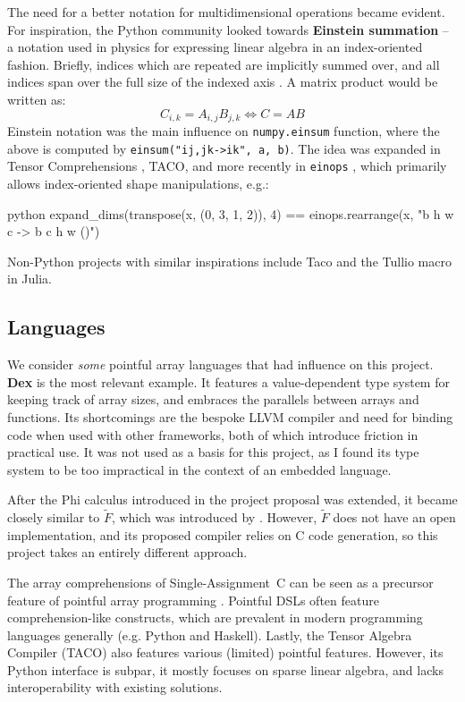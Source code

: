 The need for a better notation for multidimensional operations became evident. For inspiration, the Python community looked towards \textbf{Einstein summation} -- a notation used in physics for expressing linear algebra in an index-oriented fashion. Briefly, indices which are repeated are implicitly summed over, and all indices span over the full size of the indexed axis \cite{aahlander2002einstein}. A matrix product would be written as:
$$ C_{i,k} = A_{i,j} B_{j,k} \iff C = AB $$
Einstein notation was the main influence on \texttt{numpy.einsum} function, where the above is computed by \texttt{einsum("ij,jk->ik", a, b)}. The idea was expanded in Tensor Comprehensions \cite{vasilache2018tensor}, TACO, and more recently in \texttt{einops} \cite{rogozhnikov2021einops}, which primarily allows index-oriented shape manipulations, e.g.:
\begin{center}
\begin{cminted}{python}
expand_dims(transpose(x, (0, 3, 1, 2)), 4) == einops.rearrange(x, "b h w c -> b c h w ()")
\end{cminted}
\end{center}
Non-Python projects with similar inspirations include Taco \cite{kjolstad2017tensor} and the Tullio macro in Julia.


\subsection{Languages}

We consider \textit{some} pointful array languages that had influence on this project. \textbf{Dex} is the most relevant example. It features a value-dependent type system for keeping track of array sizes, and embraces the parallels between arrays and functions. Its shortcomings are the bespoke LLVM compiler and need for binding code when used with other frameworks, both of which introduce friction in practical use. It was not used as a basis for this project, as I found its type system to be too impractical in the context of an embedded language.

After the Phi calculus introduced in the project proposal was extended, it became closely similar to $\tilde F$, which was introduced by \textcite{shaikhha2019efficient}. However, $\tilde F$ does not have an open implementation, and its proposed compiler relies on C code generation, so this project takes an entirely different approach. 

The array comprehensions of Single-Assignment~C can be seen as a precursor feature of pointful array programming \cite{scholz1994single}. Pointful DSLs often feature comprehension-like constructs, which are prevalent in modern programming languages generally (e.g. Python and Haskell). Lastly, the Tensor Algebra Compiler (TACO) also features various (limited) pointful features. However, its Python interface is subpar, it mostly focuses on sparse linear algebra, and lacks interoperability with existing solutions.

